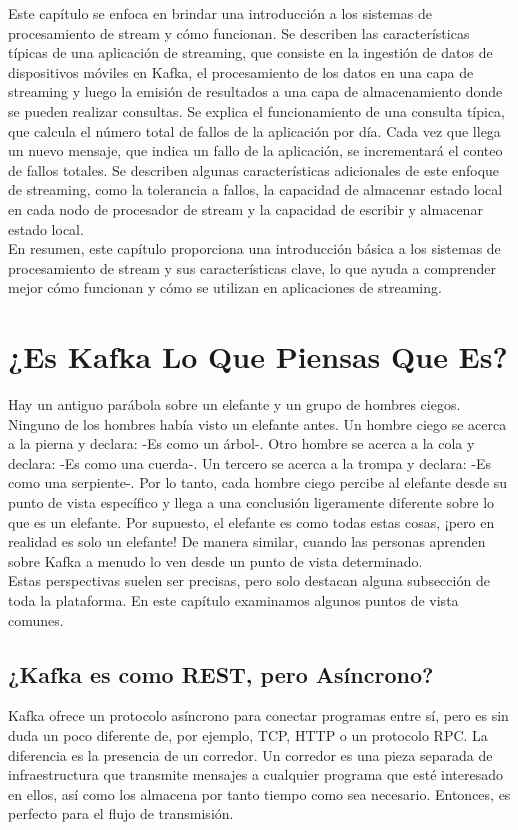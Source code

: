 \documentclass{article}
\begin{document}
Este capítulo se enfoca en brindar una introducción a los sistemas de procesamiento de stream y cómo funcionan. Se describen las características típicas de una aplicación de streaming, que consiste en la ingestión de datos de dispositivos móviles en Kafka, el procesamiento de los datos en una capa de streaming y luego la emisión de resultados a una capa de almacenamiento donde se pueden realizar consultas. Se explica el funcionamiento de una consulta típica, que calcula el número total de fallos de la aplicación por día. Cada vez que llega un nuevo mensaje, que indica un fallo de la aplicación, se incrementará el conteo de fallos totales. Se describen algunas características adicionales de este enfoque de streaming, como la tolerancia a fallos, la capacidad de almacenar estado local en cada nodo de procesador de stream y la capacidad de escribir y almacenar estado local.\\

En resumen, este capítulo proporciona una introducción básica a los sistemas de procesamiento de stream y sus características clave, lo que ayuda a comprender mejor cómo funcionan y cómo se utilizan en aplicaciones de streaming.\\
\newpage
\section{¿Es Kafka Lo Que Piensas Que Es?}
Hay un antiguo parábola sobre un elefante y un grupo de hombres ciegos. Ninguno de los hombres había visto un elefante antes. Un hombre ciego se acerca a la pierna y declara: -Es como un árbol-. Otro hombre se acerca a la cola y declara: -Es como una cuerda-. Un tercero se acerca a la trompa y declara: -Es como una serpiente-. Por lo tanto, cada hombre ciego percibe al elefante desde su punto de vista específico y llega a una conclusión ligeramente diferente sobre lo que es un elefante. Por supuesto, el elefante es como todas estas cosas, ¡pero en realidad es solo un elefante!
De manera similar, cuando las personas aprenden sobre Kafka a menudo lo ven desde un punto de vista determinado.\\ 

Estas perspectivas suelen ser precisas, pero solo destacan alguna subsección de toda la plataforma. En este capítulo examinamos algunos puntos de vista comunes.
\subsection{¿Kafka es como REST, pero Asíncrono?}
Kafka ofrece un protocolo asíncrono para conectar programas entre sí, pero es sin duda un poco diferente de, por ejemplo, TCP, HTTP o un protocolo RPC. La diferencia es la presencia de un corredor. Un corredor es una pieza separada de infraestructura que transmite mensajes a cualquier programa que esté interesado en ellos, así como los almacena por tanto tiempo como sea necesario. Entonces, es perfecto para el flujo de transmisión.\\
\end{document}
